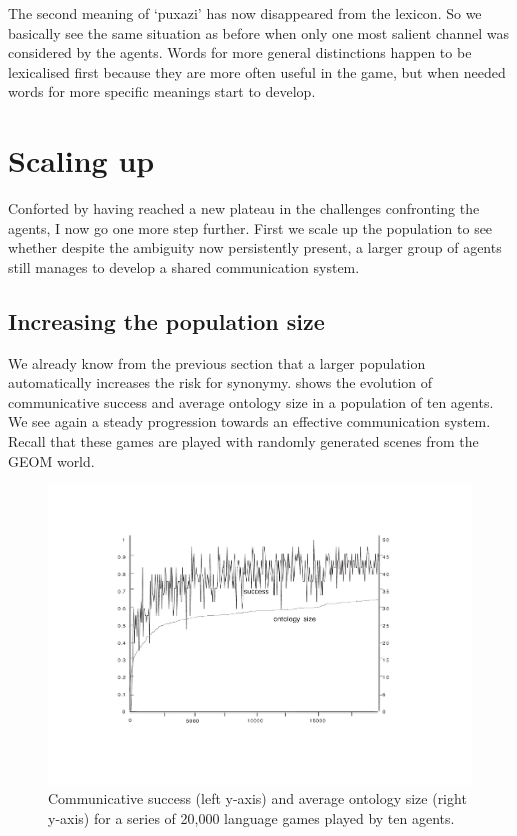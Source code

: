 The second meaning of `puxazi' has now disappeared
from the lexicon. So we basically see the same situation 
as before when only one most salient channel was
considered by the agents. Words for more general distinctions
happen to be lexicalised first because they are more 
often useful in the game, but when needed words for more specific
meanings start to develop. 

\section{Scaling up}

Conforted by having reached a new plateau in 
the challenges confronting the agents, I now go 
one more step further. First we scale up the 
population to see whether despite the ambiguity
now persistently present, a larger group of 
agents still manages to develop a shared
communication system. 

\subsection{Increasing the population size}

We already know from the previous section that 
a larger population automatically increases
the risk for synonymy.  shows the 
evolution of communicative success and average
ontology size in a population
of ten agents. We see again a steady progression
towards an effective communication system. Recall that 
these games are played with randomly generated scenes
from the GEOM world. 


\begin{figure}[htbp]
  \centerline{\includegraphics[width=\textwidth]{chap6/figs/agnt10.pdf}}
\caption{\label{agnt10}Communicative 
success (left y-axis) and average ontology size 
(right y-axis) for a series of 20,000 
language games played by ten agents.} 
\end{figure}

